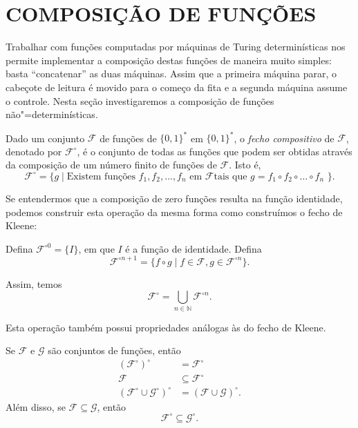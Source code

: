 \section{COMPOSIÇÃO DE FUNÇÕES}
\label{sec:function_composition}

Trabalhar com funções computadas por máquinas de Turing determinísticas
nos permite implementar a composição destas funções de maneira muito simples:
basta ``concatenar'' as duas máquinas.
Assim que a primeira máquina parar,
o cabeçote de leitura é movido para o começo da fita
e a segunda máquina assume o controle.
Nesta seção investigaremos a composição de funções não"=determinísticas.

\begin{definition}
    Dado um conjunto $\mathcal F$ de funções de $\{0, 1\}^*$ em $\{0, 1\}^*$,
    o \emph{fecho compositivo} de $\mathcal F$,
    denotado por $\mathcal F^\circ$,
    é o conjunto de todas as funções que podem ser obtidas
    através da composição de um número finito de funções de $\mathcal F$.
    Isto é,
    \begin{equation*}
        \mathcal F^\circ = \{g \mid
            \text{Existem funções $f_1, f_2, \dots, f_n$ em $\mathcal F$
                tais que $g = f_1 \circ f_2 \circ \dots \circ f_n$
            }
        \}.
    \end{equation*}
\end{definition}

Se entendermos que a composição de zero funções resulta
na função identidade,
podemos construir esta operação da mesma forma como construímos o fecho de Kleene:

Defina $\mathcal F^{\circ 0} = \{I\}$,
em que $I$ é a função de identidade.
Defina
\begin{equation*}
    \mathcal F^{\circ n+1} = \{ f \circ g \mid
        f \in \mathcal F, g \in \mathcal F^{\circ n}
    \}.
\end{equation*}

Assim, temos
\begin{equation*}
    \mathcal F^\circ = \bigcup_{n \in \mathbb N} \mathcal F^{\circ n}.
\end{equation*}

Esta operação também possui propriedades análogas às do fecho de Kleene.

\begin{proposition}
    Se $\mathcal F$ e $\mathcal G$ são conjuntos de funções, então
    \begin{align*}
        (\mathcal F^\circ)^\circ &= \mathcal F^\circ \\
        \mathcal F &\subseteq \mathcal F^\circ \\
        (\mathcal F^\circ \cup \mathcal G^\circ)^\circ &=
            (\mathcal F \cup \mathcal G)^\circ.
    \end{align*}
    Além disso, se $\mathcal F \subseteq \mathcal G$,
    então
    \begin{equation*}
        \mathcal F^\circ \subseteq \mathcal G^\circ.
    \end{equation*}
    \label{thm:compositive_closure_properties}
\end{proposition}

